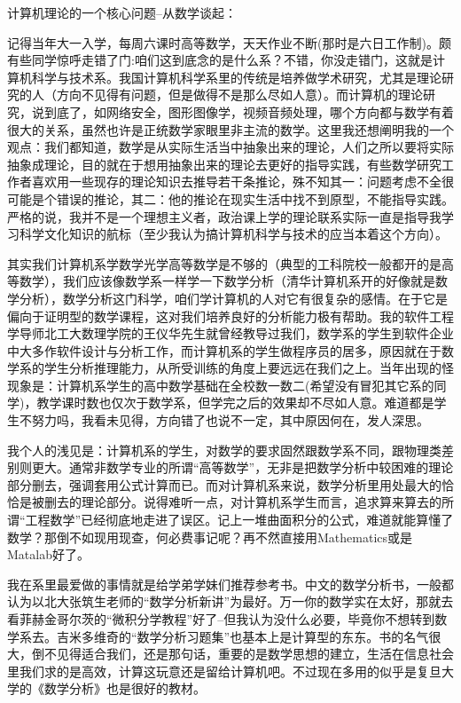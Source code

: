 计算机理论的一个核心问题--从数学谈起：


记得当年大一入学，每周六课时高等数学，天天作业不断(那时是六日工作制)。颇有些同学惊呼走错了门:咱们这到底念的是什么系？不错，你没走错门，这就是计算机科学与技术系。我国计算机科学系里的传统是培养做学术研究，尤其是理论研究的人（方向不见得有问题，但是做得不是那么尽如人意）。而计算机的理论研究，说到底了，如网络安全，图形图像学，视频音频处理，哪个方向都与数学有着很大的关系，虽然也许是正统数学家眼里非主流的数学。这里我还想阐明我的一个观点：我们都知道，数学是从实际生活当中抽象出来的理论，人们之所以要将实际抽象成理论，目的就在于想用抽象出来的理论去更好的指导实践，有些数学研究工作者喜欢用一些现存的理论知识去推导若干条推论，殊不知其一：问题考虑不全很可能是个错误的推论，其二：他的推论在现实生活中找不到原型，不能指导实践。严格的说，我并不是一个理想主义者，政治课上学的理论联系实际一直是指导我学习科学文化知识的航标（至少我认为搞计算机科学与技术的应当本着这个方向）。


其实我们计算机系学数学光学高等数学是不够的（典型的工科院校一般都开的是高等数学），我们应该像数学系一样学一下数学分析（清华计算机系开的好像就是数学分析），数学分析这门科学，咱们学计算机的人对它有很复杂的感情。在于它是偏向于证明型的数学课程，这对我们培养良好的分析能力极有帮助。我的软件工程学导师北工大数理学院的王仪华先生就曾经教导过我们，数学系的学生到软件企业中大多作软件设计与分析工作，而计算机系的学生做程序员的居多，原因就在于数学系的学生分析推理能力，从所受训练的角度上要远远在我们之上。当年出现的怪现象是：计算机系学生的高中数学基础在全校数一数二(希望没有冒犯其它系的同学)，教学课时数也仅次于数学系，但学完之后的效果却不尽如人意。难道都是学生不努力吗，我看未见得，方向错了也说不一定，其中原因何在，发人深思。


我个人的浅见是：计算机系的学生，对数学的要求固然跟数学系不同，跟物理类差别则更大。通常非数学专业的所谓“高等数学”，无非是把数学分析中较困难的理论部分删去，强调套用公式计算而已。而对计算机系来说，数学分析里用处最大的恰恰是被删去的理论部分。说得难听一点，对计算机系学生而言，追求算来算去的所谓“工程数学”已经彻底地走进了误区。记上一堆曲面积分的公式，难道就能算懂了数学？那倒不如现用现查，何必费事记呢？再不然直接用Mathematics或是Matalab好了。


我在系里最爱做的事情就是给学弟学妹们推荐参考书。中文的数学分析书，一般都认为以北大张筑生老师的“数学分析新讲”为最好。万一你的数学实在太好，那就去看菲赫金哥尔茨的“微积分学教程”好了--但我认为没什么必要，毕竟你不想转到数学系去。吉米多维奇的“数学分析习题集”也基本上是计算型的东东。书的名气很大，倒不见得适合我们，还是那句话，重要的是数学思想的建立，生活在信息社会里我们求的是高效，计算这玩意还是留给计算机吧。不过现在多用的似乎是复旦大学的《数学分析》也是很好的教材。


